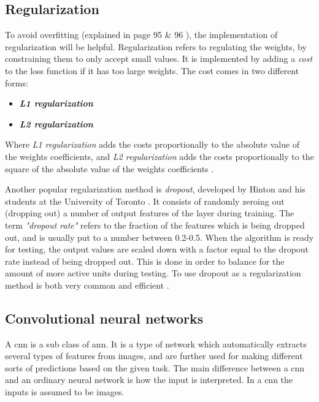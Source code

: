 \documentclass[USenglish]{ifimaster}  %
\begin{document}
\subsection{Regularization}
To avoid overfitting (explained in page 95 \& 96 \cite{Francois_Deep_learning_with_python}), the implementation of regularization will be helpful. Regularization refers to regulating the weights, by constraining them to only accept small values. It is implemented by adding a \textit{cost} to the loss function if it has too large weights. The cost comes in two different forms:

\begin{itemize}
    \item \textit{\textbf{L1 regularization}}
    \item \textit{\textbf{L2 regularization}}
\end{itemize}
Where \textit{L1 regularization} adds the costs proportionally to the absolute value of the weights coefficients, and \textit{L2 regularization} adds the costs proportionally to the square of the absolute value of the weights coefficients \cite{Francois_Deep_learning_with_python}. 

Another popular regularization method is \textit{dropout}, developed by Hinton and his students at the University of Toronto \cite{website:dropout}. It consists of randomly zeroing out (dropping out) a number of output features of the layer during training. The term \textit{"dropout rate"} refers to the fraction of the features which is being dropped out, and is usually put to a number between 0.2-0.5. When the algorithm is ready for testing, the output values are scaled down with a factor equal to the dropout rate instead of being dropped out. This is done in order to balance for the amount of more active units during testing. To use dropout as a regularization method is both very common and efficient \cite{Francois_Deep_learning_with_python}.   

\subsection{Convolutional neural networks}\label{cnn}
A \ac{cnn} is a sub class of \ac{ann}. It is a type of network which automatically extracts several types of features from images, and are further used for making different sorts of predictions based on the given task. The main difference between a \ac{cnn} and an ordinary neural network is how the input is interpreted. In a \ac{cnn} the inputs is assumed to be images. 
\end{document}
